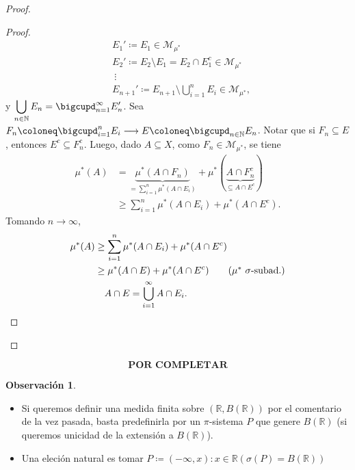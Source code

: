 \documentclass[11pt]{article}
\theoremstyle{definition} %
\newtheorem{remark}[theorem]{Observación}
\newcommand{\R}{\mathbb{R}}
\newcommand{\N}{\mathbb{N}}
\begin{document}
\begin{property}
\begin{proof}
\begin{enumerate}
\begin{proof}
			\begin{align*}
				& E_{1}' \coloneq E_{1} \in \mathscr{M}_{\mu^{*}} \\
				& E_{2}' \coloneq E_{2} \setminus E_{1} = E_2 \cap E_1^c \in \mathscr{M}_{\mu^{*}} \\
				& \ \vdots \\
				& E_{n+1}' \coloneq E_{n+1} \setminus \bigcup_{i=1}^{n} E_i \in \mathscr{M}_{\mu^{*}}
			,\end{align*}
			y $\displaystyle\bigcup_{n\in\N} E_n = \displaystyle\bigcupd_{n=1}^{\infty} E_{n}'$. Sea $F_n \coloneq \displaystyle\bigcupd_{i=1}^{n} E_i \longrightarrow E \coloneq \displaystyle\bigcupd_{n\in\N} E_n$. Notar que si $F_n \subseteq E$, entonces $E^c \subseteq F_{n}^{c}$. Luego, dado $A \subseteq X$, como $F_n \in \mathscr{M}_{\mu^{*}}$, se tiene
			\begin{align*}
				\mu^{*}(A) &= \underbrace{\mu^{*}(A \cap F_n)}_{= \sum_{i=1}^{n} \mu^{*}(A \cap E_i)} + \mu^{*}(\underbrace{A \cap F_{n}^{c}}_{\subseteq A \cap E^c}) \\
				& \geq \sum_{i=1}^{n} \mu^{*}(A \cap E_i) + \mu^{*}(A \cap E^c)
			.\end{align*}
			Tomando $n \to \infty$,
			\begin{align*}
				\mu^{*}(A) & \geq \sum_{i=1}^{n} \mu^{*}(A \cap E_i) + \mu^{*}(A \cap E^c) \\
				& \geq \mu^{*}(A \cap E) + \mu^{*}(A \cap E^c) \tag{$\mu^{*}\ \sigma$-subad.} \\
				& \quad A \cap E = \bigcup_{i=1}^{\infty} A \cap E_i
			.\end{align*}
		\end{proof}
	\end{enumerate}
\end{proof}




\[
  \textbf{POR COMPLETAR}
\]


\begin{remark}
  ~ 
  \vspace{0.05cm}
  
  \begin{itemize}
  \item Si queremos definir una medida finita sobre $(\R,B(\R))$ por el comentario de la vez pasada, basta predefinirla por un $\pi$-sistema $P$ que genere $B(\R)$  (si queremos unicidad de la extensión a $B(\R)$).

  \item Una eleción natural es tomar $P\coloneqq {(-\infty, x):x \in \R}(\sigma(P)=B(\R))$


\end{itemize}
\end{remark}
\end{property}
\end{document}
